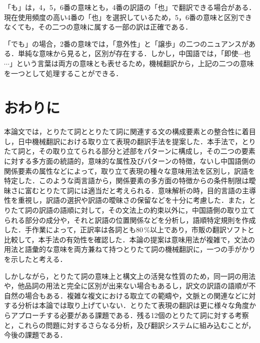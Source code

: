 \renewcommand{\labelenumi}{}
\begin{enumeratess}
 \item 「も」は，4，5，6番の意味とも，4番の訳語の「也」で翻訳できる場合がある．現在使用頻度の高い4番の「也」を選択しているため，5，6番の意味と区別できなくても，その二つの意味に属する一部の訳は正確である．
 \item 「でも」の場合，2番の意味では，「意外性」と「譲歩」の二つのニュアンスがある．単純な意味から見ると，区別が存在する．しかし，中国語では，「即使$\cdots$也$\cdots$」という言葉は両方の意味とも表せるため，機械翻訳から，上記の二つの意味を一つとして処理することができる．
\end{enumeratess}
\renewcommand{\labelenumi}{}

\section{おわりに}
本論文では，とりたて詞ととりたて詞に関連する文の構成要素との整合性に着目し，日中機械翻訳における取り立て表現の翻訳手法を提案した．本手法で，とりたて詞と，その取り立てられる部分と述部をパターンに構成し，その二つの要素に対する多方面の統語的，意味的な属性及びパターンの特徴，ないし中国語側の関係要素の属性などによって，取り立て表現の種々な意味用法を区別し，訳語を特定した．このような両言語から，関係要素の多方面の特徴からの条件制限は曖昧さに富むとりたて詞には適当だと考えられる．意味解析の時，目的言語の主導性を重視し，訳語の選択や訳語の曖昧さの保留などを十分に考慮した．また，とりたて詞の訳語の語順に対して，その文法上の約束以外に，中国語側の取り立てられる部分の成分や，それと訳語の位置関係などを分析し，語順特定規則を作成した．手作業によって，正訳率は各詞とも80\,\%以上であり，市販の翻訳ソフトと比較して，本手法の有効性を確認した．本論の提案は意味用法が複雑で，文法の用法と語彙的な意味を両方兼ねて持つとりたて詞の機械翻訳に，一つの手がかりを示したと考える．

しかしながら，とりたて詞の意味上と構文上の活発な性質のため，同一詞の用法や，他品詞の用法と完全に区別が出来ない場合もあるし，訳文の訳語の語順が不自然の場合もある．複雑な複文における取立ての範疇や，文脈との関連などに対する分析は本論では取り上げていない．とりたて表現の翻訳は更に様々な角度からアプローチする必要がある課題である．残る12個のとりたて詞に対する考察と，これらの問題に対するさらなる分析，及び翻訳システムに組み込むことが，今後の課題である．





\nocite{*}





